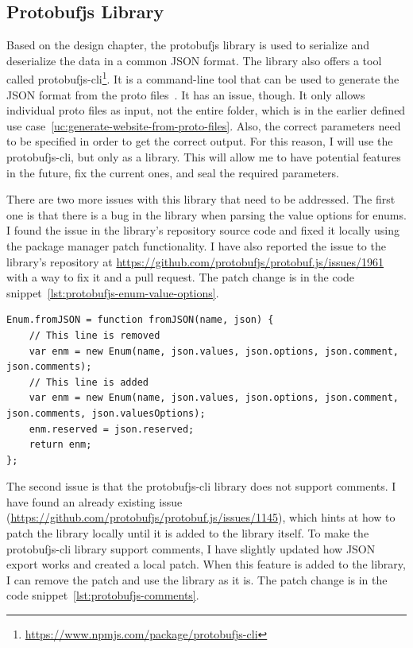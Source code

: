 \subsection{Protobufjs Library}
Based on the design chapter, the protobufjs library is used to serialize and deserialize the data in a common JSON format.
The library also offers a tool called protobufjs-cli\footnote{\url{https://www.npmjs.com/package/protobufjs-cli}}.
It is a command-line tool that can be used to generate the JSON format from the proto files~\cite{protobufjs-cli}.
It has an issue, though.
It only allows individual proto files as input, not the entire folder, which is in the earlier defined use case~\ref{uc:generate-website-from-proto-files}.
Also, the correct parameters need to be specified in order to get the correct output.
For this reason, I will use the protobufjs-cli, but only as a library.
This will allow me to have potential features in the future, fix the current ones, and seal the required parameters.

There are two more issues with this library that need to be addressed.
The first one is that there is a bug in the library when parsing the value options for enums.
I found the issue in the library's repository source code and fixed it locally using the package manager patch functionality.
I have also reported the issue to the library's repository at \url{https://github.com/protobufjs/protobuf.js/issues/1961} with a way to fix it and a pull request.
The patch change is in the code snippet~\ref{lst:protobufjs-enum-value-options}.

\begin{lstlisting}[style=JavaScript, caption={protobufjs library enum comments bug fix}, label={lst:protobufjs-enum-value-options}]
Enum.fromJSON = function fromJSON(name, json) {
    // This line is removed
    var enm = new Enum(name, json.values, json.options, json.comment, json.comments);
    // This line is added
    var enm = new Enum(name, json.values, json.options, json.comment, json.comments, json.valuesOptions);
    enm.reserved = json.reserved;
    return enm;
};
\end{lstlisting}

The second issue is that the protobufjs-cli library does not support comments.
I have found an already existing issue (\url{https://github.com/protobufjs/protobuf.js/issues/1145}), which hints at how to patch the library locally until it is added to the library itself.
To make the protobufjs-cli library support comments, I have slightly updated how JSON export works and created a local patch.
When this feature is added to the library, I can remove the patch and use the library as it is.
The patch change is in the code snippet~\ref{lst:protobufjs-comments}.

